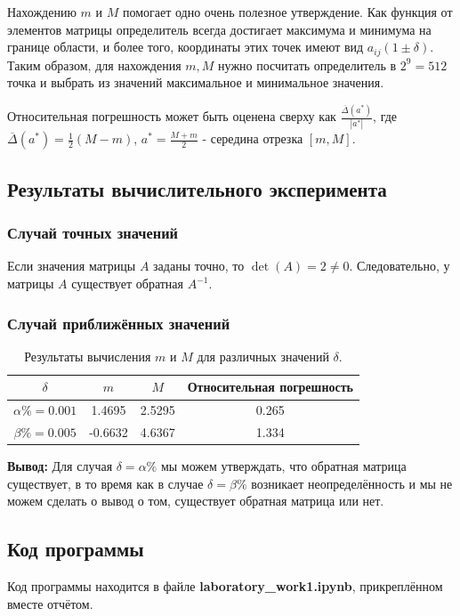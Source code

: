 \documentclass[12pt]{article}%
\begin{document}
Нахождению $m$ и $M$ помогает одно очень полезное утверждение. Как функция от элементов матрицы определитель всегда достигает максимума и минимума на границе области, и более того, координаты этих точек имеют вид $a_{ij}(1 \pm \delta)$. Таким образом, для нахождения $m, M$ нужно посчитать определитель в $2^9 = 512$ точка и выбрать из значений максимальное и минимальное значения.

Относительная погрешность может быть оценена сверху как 
$\frac{\overline{\Delta}(a^{*})}{|a^{*}|}$, где $\overline{\Delta}(a^{*}) = \frac{1}{2}\left(M - m\right)$, $a^{*} = \frac{M + m}{2}$ - середина отрезка $[m, M]$.

\subsection{Результаты вычислительного эксперимента}
\subsubsection{Случай точных значений}
Если значения матрицы $A$ заданы точно, то $\det(A) = 2 \ne 0$. Следовательно, у матрицы $A$ существует обратная $A^{-1}$. 

\subsubsection{Случай приближённых значений}
\begin{table}[h]
\centering
\begin{tabular}{|c|c|c|c|}    
\hline $\delta$           & $m$     & $M$    & Относительная погрешность \\
\hline $\alpha\% = 0.001$ & 1.4695  & 2.5295 & 0.265 \\
\hline $\beta\% = 0.005$  & -0.6632 & 4.6367 & 1.334 \\
\hline
\end{tabular}
\caption{Результаты вычисления $m$ и $M$ для различных значений $\delta$. }
\end{table}

\textbf{Вывод:} Для случая $\delta = \alpha \%$ мы можем утверждать, что обратная матрица существует, в то время как в случае $\delta = \beta \%$ возникает неопределённость и мы не можем сделать о вывод о том, существует обратная матрица или нет.

\subsection{Код программы}
Код программы находится в файле \textbf{laboratory\_work1.ipynb}, прикреплённом вместе отчётом.
\end{document}
